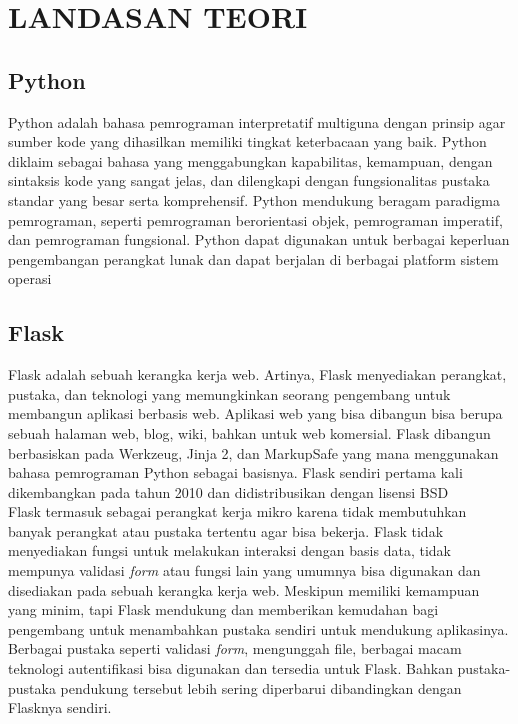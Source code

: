 \chapter{LANDASAN TEORI}

 \section{Python}
	 Python adalah bahasa pemrograman interpretatif multiguna dengan prinsip agar sumber kode yang dihasilkan memiliki tingkat keterbacaan yang baik. Python diklaim sebagai bahasa yang menggabungkan kapabilitas, kemampuan, dengan sintaksis kode yang sangat jelas, dan dilengkapi dengan fungsionalitas pustaka standar yang besar serta komprehensif. Python mendukung beragam paradigma pemrograman, seperti pemrograman berorientasi objek, pemrograman imperatif, dan pemrograman fungsional. Python dapat digunakan untuk berbagai keperluan pengembangan perangkat lunak dan dapat berjalan di berbagai platform sistem operasi \\

 \section{Flask}
	 Flask adalah sebuah kerangka kerja web. Artinya, Flask menyediakan perangkat, pustaka, dan teknologi yang memungkinkan seorang pengembang untuk membangun aplikasi berbasis web. Aplikasi web yang bisa dibangun bisa berupa sebuah halaman web, blog, wiki, bahkan untuk web komersial. Flask dibangun berbasiskan pada Werkzeug, Jinja 2, dan MarkupSafe yang mana menggunakan bahasa pemrograman Python sebagai basisnya. Flask sendiri pertama kali dikembangkan pada tahun 2010 dan didistribusikan dengan lisensi BSD \\
	 \indent Flask termasuk sebagai perangkat kerja mikro karena tidak membutuhkan banyak perangkat atau pustaka tertentu agar bisa bekerja. Flask tidak menyediakan fungsi untuk melakukan interaksi dengan basis data, tidak mempunya validasi \textit{form} atau fungsi lain yang umumnya bisa digunakan dan disediakan pada sebuah kerangka kerja web. Meskipun memiliki kemampuan yang minim, tapi Flask mendukung dan memberikan kemudahan bagi pengembang untuk menambahkan pustaka sendiri untuk mendukung aplikasinya. Berbagai pustaka seperti validasi \textit{form}, mengunggah file, berbagai macam teknologi autentifikasi bisa digunakan dan tersedia untuk Flask. Bahkan pustaka-pustaka pendukung tersebut lebih sering diperbarui dibandingkan dengan Flasknya sendiri.
	 
